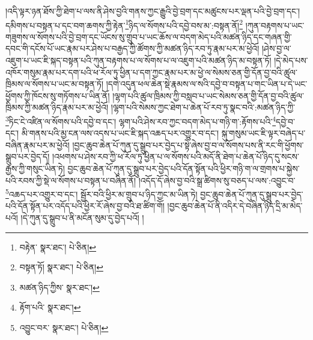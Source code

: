 །འདི་ལྟར་ཉན་ཐོས་ཀྱི་ཐེག་པ་ལས་ནི་ཤེས་བྱའི་གནས་ཀྱང་རྒྱུའི་བྱེ་བྲག་དང་མཚུངས་པར་ལྡན་པའི་བྱེ་བྲག་དང་། དམིགས་པ་བསྟན་པ་དང་བག་ཆགས་ཀྱི་རྟེན་\footnote{བརྟེན་  སྣར་ཐང་།  པེ་ཅིན། }ཉིད་ལ་སོགས་པའི་དབྱེ་བས་མ་:བསྟན་ནོ།\footnote{བསྟན་ཏོ།  སྣར་ཐང་།  པེ་ཅིན། } །ཀུན་བརྟགས་པ་ཡང་གཟུགས་ལ་སོགས་པའི་བྱེ་བྲག་དང་ཡོངས་སུ་གྲུབ་པ་ཡང་ཆོས་ལ་བདག་མེད་པའི་མཚན་ཉིད་དང་གཞན་གྱི་དབང་གི་དངོས་པོ་ཡང་རྣམ་པར་ཤེས་པ་བརྒྱད་ཀྱི་ཚོགས་ཀྱི་མཚན་ཉིད་རབ་ཏུ་རྣམ་པར་མ་ཕྱེའོ། །ཤེས་བྱ་ལ་འཇུག་པ་ཡང་ཇི་སྐད་བསྟན་པའི་ཀུན་བརྟགས་པ་ལ་སོགས་པ་ལ་འཇུག་པའི་མཚན་ཉིད་མ་བསྟན་ཏོ། །དེ་མེད་པས་འཁོར་གསུམ་རྣམ་པར་དག་པའི་ཕ་རོལ་ཏུ་ཕྱིན་པ་དག་ཀྱང་རྣམ་པར་མ་ཕྱེ་ལ་སེམས་ཅན་གྱི་དོན་བྱ་བའི་ཚུལ་ཁྲིམས་ལ་སོགས་པ་ཡང་མ་བསྟན་ཏོ། །དགེ་འདུན་ཕལ་ཆེན་སྡེ་རྣམས་ལ་སའི་དབྱེ་བ་བསྟན་པ་གང་ཡིན་པ་དེ་ཡང་ཕྱོགས་ཀྱི་ཁོངས་སུ་གཏོགས་པ་ཡིན་ནོ། །ལྷག་པའི་ཚུལ་ཁྲིམས་ཀྱི་བསླབ་པ་ཡང་སེམས་ཅན་གྱི་དོན་བྱ་བའི་ཚུལ་ཁྲིམས་ཀྱི་མཚན་ཉིད་རྣམ་པར་མ་ཕྱེའོ། །ལྷག་པའི་སེམས་ཀྱང་ཐེག་པ་ཆེན་པོ་རབ་ཏུ་སྣང་བའི་:མཚན་ཉིད་ཀྱི་\footnote{མཚན་ཉིད་ཀྱིས་  སྣར་ཐང་། }ཏིང་ངེ་འཛིན་ལ་སོགས་པའི་དབྱེ་བ་དང་། ལྷག་པའི་ཤེས་རབ་ཀྱང་བདག་མེད་པ་གཉི་ག་:རྟོགས་པའི་\footnote{རྟོག་པའི་  སྣར་ཐང་། }དབྱེ་བ་དང་། མི་གནས་པའི་མྱ་ངན་ལས་འདས་པ་ཡང་ཇི་སྐད་འཆད་པར་འགྱུར་བ་དང་། སྐུ་གསུམ་ཡང་ཇི་ལྟར་བཞེད་པ་བཞིན་རྣམ་པར་མ་ཕྱེའོ། །བྱང་ཆུབ་ཆེན་པོ་ཀུན་དུ་སྒྲུབ་པར་བྱེད་པ་སྟེ་ཞེས་བྱ་བ་ལ་སོགས་པས་ནི་རང་གི་ཕྱོགས་སྒྲུབ་པར་བྱེད་དོ། །འཕགས་པ་ཤེས་རབ་ཀྱི་ཕ་རོལ་ཏུ་ཕྱིན་པ་ལ་སོགས་པའི་མདོ་ནི་ཐེག་པ་ཆེན་པོ་ཉིད་དུ་སངས་རྒྱས་ཀྱི་གསུང་ཡིན་ཏེ། བྱང་ཆུབ་ཆེན་པོ་ཀུན་དུ་སྒྲུབ་པར་བྱེད་པའི་དོན་སྟོན་པའི་ཕྱིར་གཉི་ག་ལ་གྲགས་པ་སྐྱེས་པའི་རབས་ཀྱི་སྡེ་ལ་སོགས་པ་བསྟན་པ་བཞིན་ནོ། །འདོད་དོ་ཞེས་བྱ་བའི་སྒྲ་ཚིགས་སུ་བཅད་པ་ལས་:འབྱུང་བ་\footnote{འབྱུང་བར་  སྣར་ཐང་།  པེ་ཅིན། }འཆད་པར་འགྱུར་བ་དང་། སྦྱོར་བའི་ཕྱིར་མ་གྲུབ་པ་ཉིད་ཀྱང་མ་ཡིན་ཏེ། བྱང་ཆུབ་ཆེན་པོ་ཀུན་དུ་སྒྲུབ་པར་བྱེད་པའི་དོན་སྟོན་པར་འདོད་པའི་ཕྱིར་རོ་ཞེས་བྱ་བའི་ཐ་ཚིག་གོ། །བྱང་ཆུབ་ཆེན་པོ་ནི་འདིར་དེ་བཞིན་ཉིད་དྲི་མ་མེད་པའོ། །དེ་ཀུན་དུ་སྒྲུབ་པ་ནི་མངོན་སུམ་དུ་བྱེད་པའོ། །
